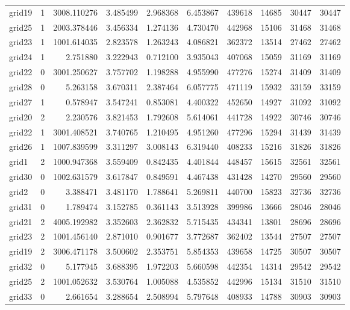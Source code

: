\documentclass[../../../thesis.tex]{subfiles}
\begin{document}
\begin{longtable}{|l|r|r|r|r|r|r|r|r|r|}
grid19 & 1 & 3008.110276 & 3.485499 & 2.968368 & 6.453867 & 439618 & 14685 & 30447 & 30447 \\
grid25 & 1 & 2003.378446 & 3.456334 & 1.274136 & 4.730470 & 442968 & 15106 & 31468 & 31468 \\
grid23 & 1 & 1001.614035 & 2.823578 & 1.263243 & 4.086821 & 362372 & 13514 & 27462 & 27462 \\
grid24 & 1 & 2.751880 & 3.222943 & 0.712100 & 3.935043 & 407068 & 15059 & 31169 & 31169 \\
grid22 & 0 & 3001.250627 & 3.757702 & 1.198288 & 4.955990 & 477276 & 15274 & 31409 & 31409 \\
grid28 & 0 & 5.263158 & 3.670311 & 2.387464 & 6.057775 & 471119 & 15932 & 33159 & 33159 \\
grid27 & 1 & 0.578947 & 3.547241 & 0.853081 & 4.400322 & 452650 & 14927 & 31092 & 31092 \\
grid20 & 2 & 2.230576 & 3.821453 & 1.792608 & 5.614061 & 441728 & 14922 & 30746 & 30746 \\
grid22 & 1 & 3001.408521 & 3.740765 & 1.210495 & 4.951260 & 477296 & 15294 & 31439 & 31439 \\
grid26 & 1 & 1007.839599 & 3.311297 & 3.008143 & 6.319440 & 408233 & 15216 & 31826 & 31826 \\
grid1 & 2 & 1000.947368 & 3.559409 & 0.842435 & 4.401844 & 448457 & 15615 & 32561 & 32561 \\
grid30 & 0 & 1002.631579 & 3.617847 & 0.849591 & 4.467438 & 431428 & 14270 & 29560 & 29560 \\
grid2 & 0 & 3.388471 & 3.481170 & 1.788641 & 5.269811 & 440700 & 15823 & 32736 & 32736 \\
grid31 & 0 & 1.789474 & 3.152785 & 0.361143 & 3.513928 & 399986 & 13666 & 28046 & 28046 \\
grid21 & 2 & 4005.192982 & 3.352603 & 2.362832 & 5.715435 & 434341 & 13801 & 28696 & 28696 \\
grid23 & 2 & 1001.456140 & 2.871010 & 0.901677 & 3.772687 & 362402 & 13544 & 27507 & 27507 \\
grid19 & 2 & 3006.471178 & 3.500602 & 2.353751 & 5.854353 & 439658 & 14725 & 30507 & 30507 \\
grid32 & 0 & 5.177945 & 3.688395 & 1.972203 & 5.660598 & 442354 & 14314 & 29542 & 29542 \\
grid25 & 2 & 1001.052632 & 3.530764 & 1.005088 & 4.535852 & 442996 & 15134 & 31510 & 31510 \\
grid33 & 0 & 2.661654 & 3.288654 & 2.508994 & 5.797648 & 408933 & 14788 & 30903 & 30903 \\

\end{longtable}
\end{document}
